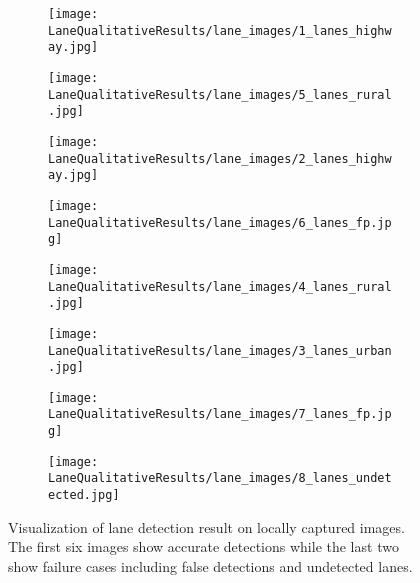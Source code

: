 \documentclass[conference]{IEEEtran}
\begin{document}
\begin{figure*}
     \centering
     \begin{subfigure}[b]{0.24\linewidth}
         \centering
         \texttt{[image: LaneQualitativeResults/lane\_images/1\_lanes\_highway.jpg]}
\end{subfigure}\begin{subfigure}[b]{0.24\linewidth}
         \centering
         \texttt{[image: LaneQualitativeResults/lane\_images/5\_lanes\_rural.jpg]}
\end{subfigure}\begin{subfigure}[b]{0.24\linewidth}
         \centering
         \texttt{[image: LaneQualitativeResults/lane\_images/2\_lanes\_highway.jpg]}
\end{subfigure}\begin{subfigure}[b]{0.24\linewidth}
         \centering
         \texttt{[image: LaneQualitativeResults/lane\_images/6\_lanes\_fp.jpg]}
\end{subfigure}\vspace{0.5em}
     
         \begin{subfigure}[b]{0.24\linewidth}
         \centering
         \texttt{[image: LaneQualitativeResults/lane\_images/4\_lanes\_rural.jpg]}
\end{subfigure}\begin{subfigure}[b]{0.24\linewidth}
         \centering
         \texttt{[image: LaneQualitativeResults/lane\_images/3\_lanes\_urban.jpg]}
\end{subfigure}\begin{subfigure}[b]{0.24\linewidth}
         \centering
         \texttt{[image: LaneQualitativeResults/lane\_images/7\_lanes\_fp.jpg]}
\end{subfigure}\begin{subfigure}[b]{0.24\linewidth}
         \centering
         \texttt{[image: LaneQualitativeResults/lane\_images/8\_lanes\_undetected.jpg]}
\end{subfigure}\vspace{0.5em}
     
     \caption{ 
    Visualization of lane detection result on locally captured images. The first six images show accurate detections while the last two show failure cases including false detections and undetected lanes.}
     \label{fi:local_lane_qualitative_results}
\end{figure*}
\end{document}
